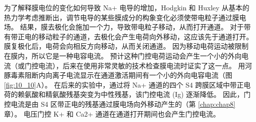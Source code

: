 为了解释膜电位的变化如何导致 Na+ 电导的增加，Hodgkin 和 Huxley 从基本的热力学考虑推断出，调节电导的某些膜成分的构象变化必须使带电粒子通过膜电场。 
结果，膜去极化会施加一个力，导致带电粒子移动，从而打开通道。 
对于带有带正电的移动粒子的通道，去极化会产生电荷向外移动，这应该先于通道打开。 
膜复极化后，电荷会向相反方向移动，从而关闭通道。 
因为移动电荷运动被限制在膜内，所以它是一种电容电流。 
预计这种门控电荷运动会产生一个小的外向电流（或门控电流），后来在使用非常灵敏的技术检查膜电流时证实了这一点。 
用河豚毒素阻断内向离子电流显示在通道激活期间有一个小的外向电容电流（图 \ref{fig:10_10}A）。 
在后来的实验中，通过将 Na+ 通道的四个 S4 跨膜区域中带正电荷的赖氨酸和精氨酸残基突变为中性残基，该门控电流 (Ig) 逐渐降低。 
因此，门控电流是由 S4 区带正电的残基通过膜电场向外移动产生的（第 \ref{chap:chap8} 章）。 
电压门控 K+ 和 Ca2+ 通道在通道打开期间也会产生门控电流。


